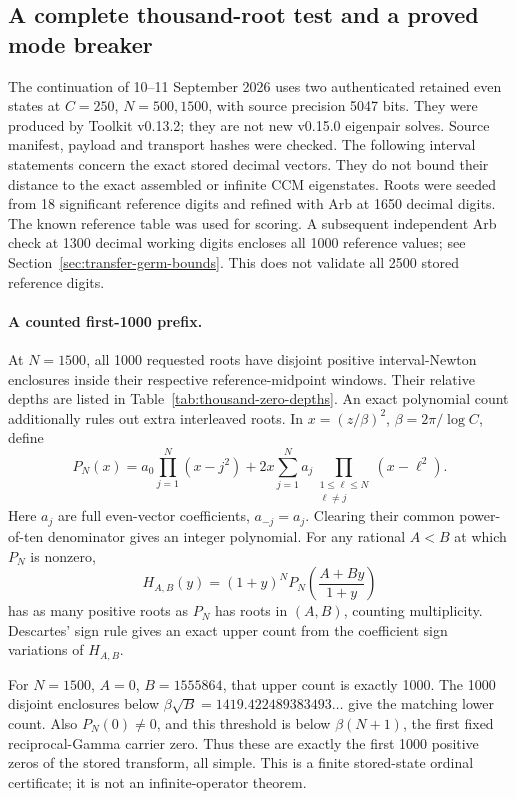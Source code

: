 \subsection{A complete thousand-root test and a proved mode breaker}
\label{ssec:thousand-zero-campaign}

The continuation of 10--11 September 2026 uses two authenticated retained
even states at $C=250$, $N=500,1500$, with source precision 5047 bits.
They were produced by Toolkit v0.13.2; they are not new v0.15.0 eigenpair
solves. Source manifest, payload and transport hashes were checked. The
following interval statements concern the exact stored decimal vectors.
They do not bound their distance to the exact assembled or infinite CCM
eigenstates. Roots were seeded from 18 significant reference digits and
refined with Arb at 1650 decimal digits. The known reference table was
used for scoring. A subsequent independent Arb check at 1300 decimal
working digits encloses all 1000 reference values; see
Section~\ref{sec:transfer-germ-bounds}. This does not validate all
2500 stored reference digits.

\paragraph{A counted first-1000 prefix.}
At $N=1500$, all 1000 requested roots have disjoint positive interval-Newton
enclosures inside their respective reference-midpoint windows. Their
relative depths are listed in Table~\ref{tab:thousand-zero-depths}.
An exact polynomial count additionally rules out extra interleaved roots.
In $x=(z/\beta)^2$, $\beta=2\pi/\log C$, define
\begin{equation}\label{eq:integer-secular-numerator}
 P_N(x)=a_0\prod_{j=1}^N(x-j^2)
       +2x\sum_{j=1}^N a_j\prod_{\substack{1\le\ell\le N\\\ell\ne j}}
                         (x-\ell^2).
\end{equation}
Here $a_j$ are full even-vector coefficients, $a_{-j}=a_j$. Clearing
their common power-of-ten denominator gives an integer polynomial.
For any rational $A<B$ at which $P_N$ is nonzero,
\[
 H_{A,B}(y)=(1+y)^N P_N\!\left(\frac{A+By}{1+y}\right)
\]
has as many positive roots as $P_N$ has roots in $(A,B)$, counting
multiplicity. Descartes' sign rule gives an exact upper count from the
coefficient sign variations of $H_{A,B}$.

For $N=1500$, $A=0$, $B=1555864$, that upper count is exactly 1000.
The 1000 disjoint enclosures below
$\beta\sqrt B=1419.422489383493\ldots$ give the matching lower count.
Also $P_N(0)\ne0$, and this threshold is below $\beta(N+1)$, the first
fixed reciprocal-Gamma carrier zero. Thus these are exactly the first
1000 positive zeros of the stored transform, all simple. This is a finite
stored-state ordinal certificate; it is not an infinite-operator theorem.

